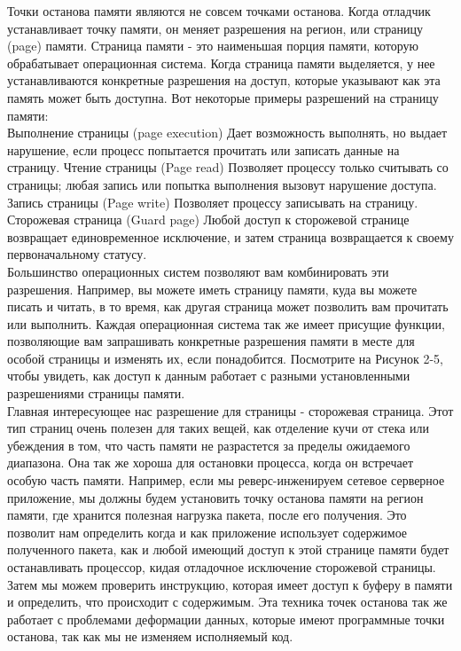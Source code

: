 \documentclass[12pt, a4paper, oneside]{book}
\begin{document}
Точки останова памяти являются не совсем точками останова. Когда отладчик устанавливает точку памяти, он меняет разрешения на регион, или страницу (page) памяти. Страница памяти - это наименьшая порция памяти, которую обрабатывает операционная система. Когда страница памяти выделяется, у нее устанавливаются конкретные разрешения на доступ, которые указывают как эта память может быть доступна. Вот некоторые примеры разрешений на страницу памяти:\\

    Выполнение страницы (page execution) Дает возможность выполнять, но выдает нарушение, если процесс попытается прочитать или записать данные на страницу.
    Чтение страницы (Page read) Позволяет процессу только считывать со страницы; любая запись или попытка выполнения вызовут нарушение доступа.
    Запись страницы (Page write) Позволяет процессу записывать на страницу.
    Сторожевая страница (Guard page) Любой доступ к сторожевой странице возвращает единовременное исключение, и затем страница возвращается к своему первоначальному статусу.\\

Большинство операционных систем позволяют вам комбинировать эти разрешения. Например, вы можете иметь страницу памяти, куда вы можете писать и читать, в то время, как другая страница может позволить вам прочитать или выполнить. Каждая операционная система так же имеет присущие функции, позволяющие вам запрашивать конкретные разрешения памяти в месте для особой страницы и изменять их, если понадобится. Посмотрите на Рисунок 2-5, чтобы увидеть, как доступ к данным работает с разными установленными разрешениями страницы памяти.\\

Главная интересующее нас разрешение для страницы - сторожевая страница. Этот тип страниц очень полезен для таких вещей, как отделение кучи от стека или убеждения в том, что часть памяти не разрастется за пределы ожидаемого диапазона. Она так же хороша для остановки процесса, когда он встречает особую часть памяти. Например, если мы реверс-инженируем сетевое серверное приложение, мы должны будем установить точку останова памяти на регион памяти, где хранится полезная нагрузка пакета, после его получения. Это позволит нам определить когда и как приложение использует содержимое полученного пакета, как и любой имеющий доступ к этой странице памяти будет останавливать процессор, кидая отладочное исключение сторожевой страницы. Затем мы можем проверить инструкцию, которая имеет доступ к буферу в памяти и определить, что происходит с содержимым. Эта техника точек останова так же работает с проблемами деформации данных, которые имеют программные точки останова, так как мы не изменяем исполняемый код.\\
\end{document}
